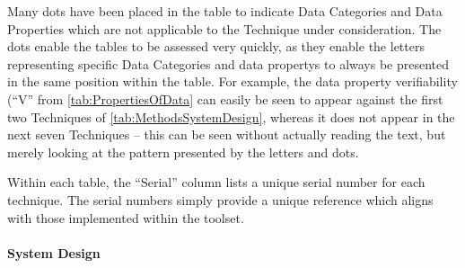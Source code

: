 Many dots have been placed in the table to indicate Data Categories and Data Properties which are not applicable to the Technique under consideration. The dots enable the tables to be assessed very quickly, as they enable the letters representing specific Data Categories and \glspl{data property} to always be presented in the same position within the table. For example, the \gls{data property} \gls{verifiability} (``V'' from \autoref{tab:PropertiesOfData} can easily be seen to appear against the first two Techniques of \autoref{tab:MethodsSystemDesign}, whereas it does not appear in the next seven Techniques -- this can be seen without actually reading the text, but merely looking at the pattern presented by the letters and dots. 

Within each table, the ``Serial'' column lists a unique serial number for each technique. The serial numbers simply provide a unique reference which aligns with those implemented within the toolset.

\paragraph{System Design}

